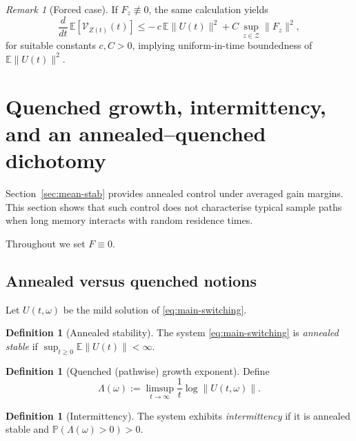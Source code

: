 \documentclass[12pt,a4paper]{article}
\theoremstyle{plain}
\theoremstyle{definition}
\newtheorem{definition}[theorem]{Definition}
\theoremstyle{remark}
\newtheorem{remark}[theorem]{Remark}
\begin{document}
\begin{remark}[Forced case]
	If $F_z\not\equiv 0$, the same calculation yields
	\[
	\frac{d}{dt}\,\mathbb E[\mathcal V_{Z(t)}(t)]
	\le
	-\,c\,\mathbb E\|U(t)\|^2
	+
	C\,\sup_{z\in\mathcal Z}\|F_z\|^2,
	\]
	for suitable constants $c,C>0$, implying uniform-in-time boundedness of $\mathbb E\|U(t)\|^2$.
\end{remark}

\section{Quenched growth, intermittency, and an annealed--quenched dichotomy}
\label{sec:as-stab}

Section~\ref{sec:mean-stab} provides annealed control under averaged gain margins.
This section shows that such control does not characterise typical sample paths when long
memory interacts with random residence times.

Throughout we set $F\equiv 0$.

\subsection{Annealed versus quenched notions}
\label{subsec:annealed-quenched}

Let $U(t,\omega)$ be the mild solution of \eqref{eq:main-switching}.

\begin{definition}[Annealed stability]
	\label{def:annealed}
	The system \eqref{eq:main-switching} is \emph{annealed stable} if
	$\sup_{t\ge 0}\mathbb E\|U(t)\|<\infty$.
\end{definition}

\begin{definition}[Quenched (pathwise) growth exponent]
	\label{def:quenched-exp}
	Define
	\begin{equation}
		\label{eq:Lambda}
		\Lambda(\omega):=\limsup_{t\to\infty}\frac{1}{t}\log\|U(t,\omega)\|.
	\end{equation}
\end{definition}

\begin{definition}[Intermittency]
	\label{def:intermittency}
	The system exhibits \emph{intermittency} if it is annealed stable and
	$\mathbb P(\Lambda(\omega)>0)>0$.
\end{definition}
\end{document}
